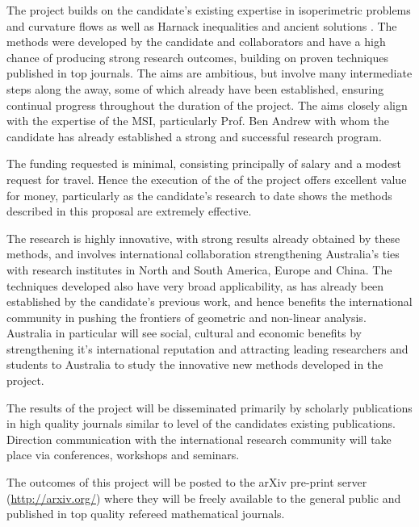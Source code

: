 \documentclass[12pt]{amsart}
\begin{document}
\smallskip{}
\label{sec-5}
The project builds on the candidate's existing expertise in isoperimetric problems and curvature flows \cite{Bryan,pbthesis,MR2843240,MR2794630,MR2729306} as well as Harnack inequalities and ancient solutions \cite{BIS4,bryanlouie,2016arXiv160401694B,2015arXiv150802821B,2015arXiv151203374B}. The methods were developed by the candidate and collaborators and have a high chance of producing strong research outcomes, building on proven techniques published in top journals. The aims are ambitious, but involve many intermediate steps along the away, some of which already have been established, ensuring continual progress throughout the duration of the project. The aims closely align with the expertise of the MSI, particularly Prof. Ben Andrew with whom the candidate has already established a strong and successful research program.

\smallskip{}
\label{sec-6}
The funding requested is minimal, consisting principally of salary and a modest request for travel. Hence the execution of the of the project offers excellent value for money, particularly as the candidate's research to date shows the methods described in this proposal are extremely effective. 

The research is highly innovative, with strong results already obtained by these methods, and involves international collaboration strengthening Australia's ties with research institutes in North and South America, Europe and China. The techniques developed also have very broad applicability, as has already been established by the candidate's previous work, and hence benefits the international community in pushing the frontiers of geometric and non-linear analysis. Australia in particular will see social, cultural and economic benefits by strengthening it's international reputation and attracting leading researchers and students to Australia to study the innovative new methods developed in the project.

\smallskip{}
\label{sec-7}
The results of the project will be disseminated primarily by scholarly publications in high quality journals similar to level of the candidates existing publications. Direction communication with the international research community will take place via conferences, workshops and seminars.

\smallskip{}
\label{sec-8}
The outcomes of this project will be posted to the arXiv pre-print server (\url{http://arxiv.org/}) where they will be freely available to the general public and published in top quality refereed mathematical journals.

\printbibliography
\end{document}

